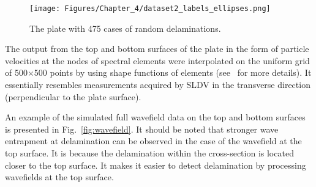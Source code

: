 \begin{figure}[!htb]
	\centering
	\texttt{[image: Figures/Chapter\_4/dataset2\_labels\_ellipses.png]}
	\caption{The plate with 475 cases of random delaminations.}
	\label{fig:random_delam}
\end{figure}

The output from the top and bottom surfaces of the plate in the form of particle velocities at the nodes of spectral elements were interpolated on the uniform grid of 500\(\times\)500 points by using shape functions of elements (see~\cite{Kudela2020} for more details).
It essentially resembles measurements acquired by SLDV in the transverse direction (perpendicular to the plate surface).

An example of the simulated full wavefield data on the top and bottom surfaces is presented in Fig.~\ref{fig:wavefield}.
It should be noted that stronger wave entrapment at delamination can be observed in the case of the wavefield at the top surface.
It is because the delamination within the cross-section is located closer to the top surface.
It makes it easier to detect delamination by processing wavefields at the top surface.

